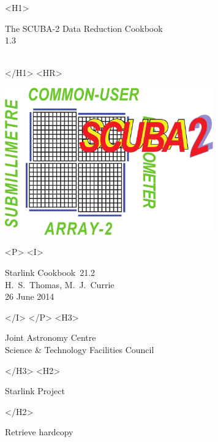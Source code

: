 \documentclass[twoside,11pt]{article}
\newcommand{\stardoccategory}  {Starlink Cookbook}
\newcommand{\stardocsource}    {sc\stardocnumber}
\newcommand{\stardocnumber}    {21.2}
\newcommand{\stardocauthors}   {H.\ S.\ Thomas, M.\ J.\ Currie}
\newcommand{\stardocdate}      {26 June 2014}
\newcommand{\stardoctitle}     {The SCUBA-2 Data Reduction Cookbook}
\newcommand{\stardocversion}   {1.3}
\newcommand{\stardocmanual}    {\ }
\newcommand{\htmladdnormallink}[2]{#1}
\newcommand{\htmladdimg}[1]{}
\newcommand{\xlabel}[1]{}
\renewcommand{\_}{\texttt{\symbol{95}}}
\begin{document}
\begin{htmlonly}
   \xlabel{}
   \begin{rawhtml} <H1> \end{rawhtml}
      \stardoctitle\\
      \stardocversion\\
      \stardocmanual
   \begin{rawhtml} </H1> <HR> \end{rawhtml}

   \includegraphics[width=90mm]{sc21_s2logo}

   \begin{rawhtml} <P> <I> \end{rawhtml}
   \stardoccategory\ \stardocnumber \\
   \stardocauthors \\
   \stardocdate
   \begin{rawhtml} </I> </P> <H3> \end{rawhtml}
      \htmladdnormallink{Joint Astronomy Centre}
                        {http://www.jach.hawaii.edu}\\
      \htmladdnormallink{Science \& Technology Facilities Council}
                        {http://www.scitech.ac.uk} \\
   \begin{rawhtml} </H3> <H2> \end{rawhtml}
      \htmladdnormallink{Starlink Project}{http://www.starlink.ac.uk/}
   \begin{rawhtml} </H2> \end{rawhtml}
   \htmladdnormallink{\htmladdimg{source.gif} Retrieve hardcopy}
      {http://www.starlink.ac.uk/cgi-bin/hcserver?\stardocsource}\\


\end{htmlonly}
\end{document}
